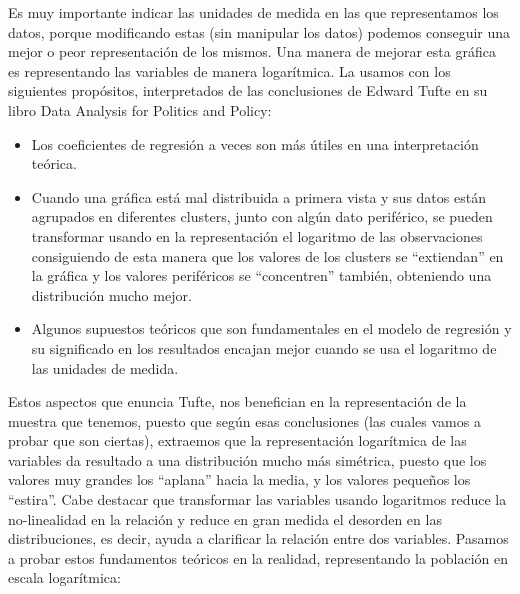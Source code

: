 \documentclass [a4paper] {article}
\begin{document}
Es muy importante indicar las unidades de medida en las que representamos los datos, porque modificando estas (sin manipular los datos) 
podemos conseguir una mejor o peor representación de los mismos. Una manera de mejorar esta gráfica es representando las variables de manera 
logarítmica. La usamos con los siguientes propósitos, interpretados de las conclusiones de Edward Tufte en su libro Data Analysis for Politics and Policy: 
\begin{itemize}
  \item Los coeficientes de regresión a veces son más útiles en una interpretación teórica.
  \item Cuando una gráfica está mal distribuida a primera vista y sus datos están agrupados en diferentes clusters, junto con algún dato periférico, se pueden transformar usando en la representación el logaritmo de las observaciones consiguiendo de esta manera que los valores de los clusters se “extiendan” en la gráfica y los valores periféricos se “concentren” también, obteniendo una distribución mucho mejor.
  \item Algunos supuestos teóricos que son fundamentales en el modelo de regresión y su significado en los resultados encajan mejor cuando se usa el logaritmo de las unidades de medida.
\end{itemize}
Estos aspectos que enuncia Tufte, nos benefician en la representación de la muestra que tenemos, puesto que según esas conclusiones (las cuales vamos a probar 
que son ciertas), extraemos que la representación logarítmica de las variables da resultado a una distribución mucho más simétrica, 
puesto que los valores muy grandes los “aplana” hacia la media, y los valores pequeños los “estira”. 
Cabe destacar que transformar las variables usando logaritmos reduce la no-linealidad en la relación y reduce en gran medida el desorden 
en las distribuciones, es decir, ayuda a clarificar la relación entre dos variables. Pasamos a probar estos fundamentos teóricos en la realidad, 
representando la población en escala logarítmica: 
\end{document}
